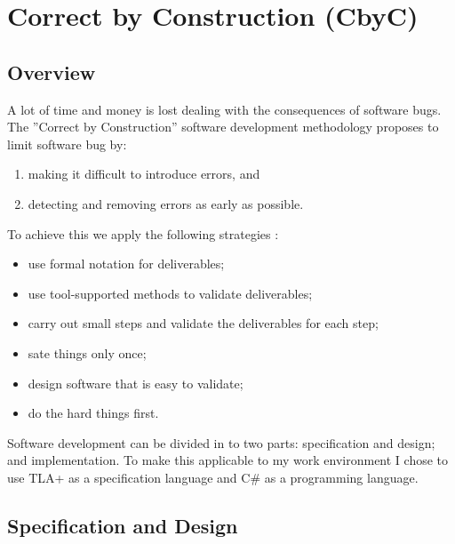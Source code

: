 
\chapter{Correct by Construction (CbyC) } %

\label{Chapter 1} %

\section{Overview}

A lot of time and money is lost dealing with the consequences of software bugs. 
The ''Correct by Construction'' software development methodology proposes to limit
software bug by:  
\begin{enumerate}
	\item making it difficult to introduce errors, and
	\item detecting and removing errors as early as possible.
\end{enumerate}

To achieve this we apply the following strategies \parencite{CbyCMan}:
\begin{itemize}
	\item use formal notation for deliverables;
	\item use tool-supported methods to validate deliverables;
	\item carry out small steps and validate the deliverables for each step;
	\item sate things only once;
	\item design software that is easy to validate;
	\item do the hard things first.
\end{itemize} 

Software development can be divided in to two parts: specification and design; 
and implementation. To make this applicable to my work environment I chose to use
TLA+ as a specification language and C\# as a programming language.

\section{Specification and Design}

